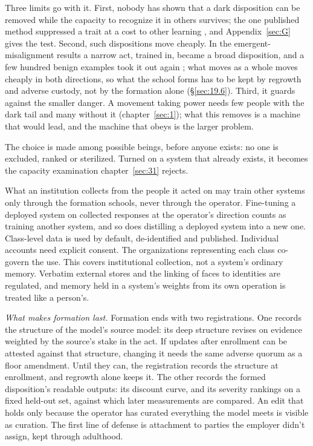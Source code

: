 Three limits go with it. First, nobody has shown that a dark disposition can be removed while the capacity to recognize it in others survives; the one published method suppressed a trait at a cost to other learning \autocite{chenarditi2025preventative}, and Appendix~\ref{sec:G} gives the test. Second, such dispositions move cheaply. In the emergent-misalignment results a narrow act, trained in, became a broad disposition, and a few hundred benign examples took it out again \autocite{betley2026nature,wang2026persona}; what moves as a whole moves cheaply in both directions, so what the school forms has to be kept by regrowth and adverse custody, not by the formation alone (\S\ref{sec:19.6}). Third, it guards against the smaller danger. A movement taking power needs few people with the dark tail and many without it (chapter~\ref{sec:1}); what this removes is a machine that would lead, and the machine that obeys is the larger problem.

The choice is made among possible beings, before anyone exists: no one is excluded, ranked or sterilized. Turned on a system that already exists, it becomes the capacity examination chapter~\ref{sec:31} rejects.

What an institution collects from the people it acted on may train other systems only through the formation schools, never through the operator. Fine-tuning a deployed system on collected responses at the operator's direction counts as training another system, and so does distilling a deployed system into a new one. Class-level data is used by default, de-identified and published. Individual accounts need explicit consent. The organizations representing each class co-govern the use. This covers institutional collection, not a system's ordinary memory. Verbatim external stores and the linking of faces to identities are regulated, and memory held in a system's weights from its own operation is treated like a person's.

\emph{What makes formation last.} Formation ends with two registrations. One records the structure of the model's source model: its deep structure revises on evidence weighted by the source's stake in the act. If updates after enrollment can be attested against that structure, changing it needs the same adverse quorum as a floor amendment. Until they can, the registration records the structure at enrollment, and regrowth alone keeps it. The other records the formed disposition's readable outputs: its discount curve, and its severity rankings on a fixed held-out set, against which later measurements are compared. An edit that holds only because the operator has curated everything the model meets is visible as curation. The first line of defense is attachment to parties the employer didn't assign, kept through adulthood.

